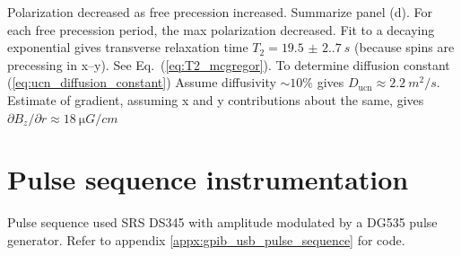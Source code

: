 Polarization decreased as free precession increased. Summarize panel (d). For each free precession period, the max polarization decreased. Fit to a decaying exponential gives transverse relaxation time $T_2=\qty{19.5(2.7)}{s}$ (because spins are precessing in x--y). See Eq.~(\ref{eq:T2_mcgregor}). To determine diffusion constant (\ref{eq:ucn_diffusion_constant}) Assume \ucn diffusivity $\sim 10\%$ gives $D_\text{ucn}\approx \qty{2.2}{m^2 \per s}$\cite{golubUCN}. Estimate of gradient, assuming x and y contributions about the same, gives $\partial B_z/\partial r \approx \qty{18}{\micro G \per cm}$ 


\section{Pulse sequence instrumentation}


Pulse sequence used SRS DS345 with amplitude modulated by a DG535 pulse generator. Refer to appendix \ref{appx:gpib_usb_pulse_sequence} for code.